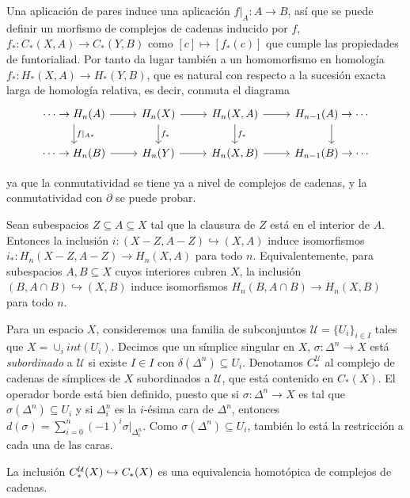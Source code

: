 \documentclass[TA.tex]{subfiles}
\begin{document}
Una aplicación de pares induce una aplicación $f|_A:A\to B$, así que se puede definir un morfismo de complejos de cadenas inducido por $f$, $f_*:C_*(X,A)\to C_*(Y,B)$ como $[c]\mapsto [f_*(c)]$ que cumple las propiedades de funtorialiad. Por tanto da lugar también a un homomorfismo en homología $f_*:H_*(X,A)\to H_*(Y,B)$, que es natural con respecto a la sucesión exacta larga de homología relativa, es decir, conmuta el diagrama 
\[
\begin{tikzcd}
\cdots \to H_n(A)\arrow[r]\arrow[d, "f|_{A*}"] & H_n(X)\arrow[r]\arrow[d, "f_*"] & H_n(X,A)\arrow[d, "f_*"]\arrow[r] &H_{n-1}(A)\arrow[d]\to\cdots\\
\cdots \to H_n(B)\arrow[r] & H_n(Y)\arrow[r] & H_n(X,B)\arrow[r]& H_{n-1}(B)\to\cdots
\end{tikzcd}
\]

ya que la conmutatividad se tiene ya a nivel de complejos de cadenas, y la conmutatividad con $\partial$ se puede probar. 
 

\begin{teorema}[de excisión]\label{excision}
Sean subespacios $Z\subseteq A\subseteq X$ tal que la clausura de $Z$ está en el interior de $A$. Entonces la inclusión $i:(X-Z,A-Z)\hookrightarrow (X,A)$ induce isomorfismos $i_*:H_n(X-Z,A-Z)\to H_n(X,A)$ para todo $n$. Equivalentemente, para subespacios $A,B\subseteq X$ cuyos interiores cubren $X$, la inclusión $(B,A\cap B)\hookrightarrow (X,B)$ induce isomorfismos $H_n(B,A\cap B)\to H_n(X,B)$ para todo $n$. 
\end{teorema}

Para un espacio $X$, consideremos una familia de subconjuntos $\mathcal{U}=\{U_i\}_{i\in I}$ tales que $X=\cup_i int(U_i)$. Decimos que un símplice singular en $X$, $\sigma:\Delta^n\to X$ está \emph{subordinado} a $\mathcal{U}$ si existe $I\in I$ con $\delta(\Delta^n)\subseteq U_i$. Denotamos $C^{\mathcal{U}}_*$ al complejo de cadenas de símplices de $X$ subordinados a $\mathcal{U}$, que está contenido en $C_*(X)$.  El operador borde está bien definido, puesto que si $\sigma:\Delta^n\to X$ es tal que $\sigma(\Delta^n)\subseteq U_i$ y si $\Delta^n_i$ es la $i$-ésima cara de $\Delta^n$, entonces $d(\sigma)=\sum_{i=0}^n(-1)^i\sigma|_{\Delta^n_i}$. Como $\sigma(\Delta^n)\subseteq U_i$, también lo está la restricción a cada una de las caras.

\begin{teorema}\label{peque}
La inclusión $C^{\mathcal{U}}_*(X)\hookrightarrow C_*(X)$ es una equivalencia homotópica de complejos de cadenas. 
\end{teorema}
\end{document}
